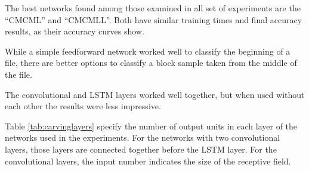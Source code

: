 The best networks found among those examined in all set of experiments are the ``CMCML'' and ``CMCMLL''. Both have similar training times and final accuracy results, as their accuracy curves show. 

While a simple feedforward network worked well to classify the beginning of a file, there are better options to classify a block sample taken from the middle of the file.

The convolutional and LSTM layers worked well together, but when used without each other the results were less impressive.

Table \ref{tab:carvinglayers} specify the number of output units in each layer of the networks used in the experiments. For the networks with two convolutional layers, those layers are connected together before the LSTM layer. For the convolutional layers, the input number indicates the size of the receptive field. 
